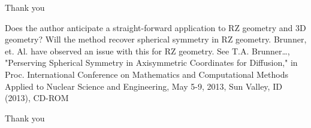 \documentclass{article}
\begin{document}
Thank you
\bigskip



{
\color{blue}
Does the author anticipate a straight-forward application to RZ geometry and 3D geometry? Will the
method recover spherical symmetry in RZ geometry. Brunner, et. Al. have observed an issue with this for RZ
geometry. See T.A. Brunner…, "Perserving Spherical Symmetry in Axisymmetric Coordinates for Diffusion,"
in Proc. International Conference on Mathematics and Computational Methods Applied to Nuclear Science and
Engineering, May 5-9, 2013, Sun Valley, ID (2013), CD-ROM
}


Thank you
\bigskip
\end{document}
